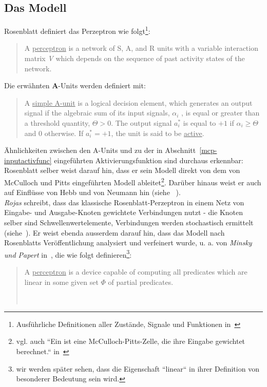 \subsection{Das Modell}

Rosenblatt definiert das Perzeptron wie folgt\footnote{
    Ausführliche Definitionen aller Zustände, Signale und Funktionen in~\cite[79 - 94]{Ros62}
}:

\blockquote[{\cite[83 ``DEFINITION 17``; Hervorhebung i.O.]{Ros62}}]{
    A \underline{perceptron} is a network of S, A, and R units with a variable interaction matrix \textit{V} which depends on the
    sequence of past activity states of the network.
}

Die erwähnten \textbf{A}-Units werden definiert mit:

\blockquote[{\cite[81  ``DEFINITION 9``; Hervorhebung i.O.]{Ros62}}]{
    A \underline{simple A-unit} is a logical decision element, which
    generates an output signal if the algebraic sum of its
    input signals, $\alpha_i$ , is equal or greater than a threshold
    quantity, $\Theta > 0$. The output signal $a^*_i$ is equal to $+1$ if $\alpha_i \geq \Theta$ and $0$ otherwise. If $a^*_i = +1$,
    the unit is said to be \underline{active}.
}


Ähnlichkeiten zwischen den A-Units und zu der in Abschnitt~\ref{mcp-inputactivfunc} eingeführten Aktivierungsfunktion sind durchaus erkennbar: Rosenblatt selber weist darauf hin, dass er sein Modell direkt von dem von McCulloch und Pitts eingeführten Modell ableitet\footnote{
    vgl. auch ``Ein  ist eine McCulloch-Pitts-Zelle, die ihre Eingabe gewichtet berechnet.`` in~\cite[57, ``Definition 3.1``; Hervorhebung i.O.]{Roj93}
}. Darüber hinaus weist er auch auf Einflüsse von Hebb und von Neumann hin (siehe ~\cite[5]{Ros62}).\\


\textit{Rojas} schreibt, dass das klassische Rosenblatt-Perzeptron in einem Netz von Eingabe- und Ausgabe-Knoten gewichtete Verbindungen nutzt - die Knoten selber sind Schwellenwertelemente, Verbindungen werden stochastisch ermittelt (siehe~\cite[51]{Roj93}).
Er weist ebenda ausserdem darauf hin, dass das Modell nach Rosenblatts Veröffentlichung analysiert und verfeinert wurde, u. a. von \textit{Minsky und Papert} in~\cite{MP88}, die wie folgt definieren\footnote{wir werden später sehen, dass die Eigenschaft ``linear`` in ihrer Definition von besonderer Bedeutung sein wird.}:

\blockquote[{~\cite[12; Hervorhebung i.O.]{MP88}}]{
    A \underline{perceptron} is a device capable of computing all predicates which are linear in some given set $\Phi$ of partial predicates.
}

